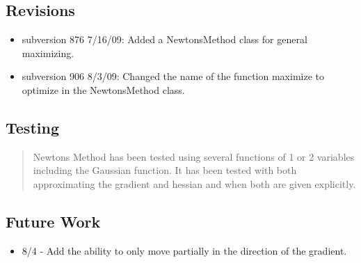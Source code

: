\documentclass[10pt]{article}%
\begin{document}
\subsection*{Revisions}

\begin{itemize}\item  subversion 876 7/16/09: Added a NewtonsMethod class for general maximizing.
\item  subversion 906 8/3/09: Changed the name of the function maximize to optimize in the NewtonsMethod class.
\end{itemize}

\subsection*{Testing}

\begin{quotation} Newtons Method has been tested using several functions of 1 or 2 variables including the Gaussian function. It has been tested with both approximating the gradient and hessian and when both are given explicitly.\end{quotation}

\subsection*{Future Work}

\begin{itemize}\item  8/4 - Add the ability to only move partially in the direction of the gradient.
\end{itemize}
    

%
\end{document}
